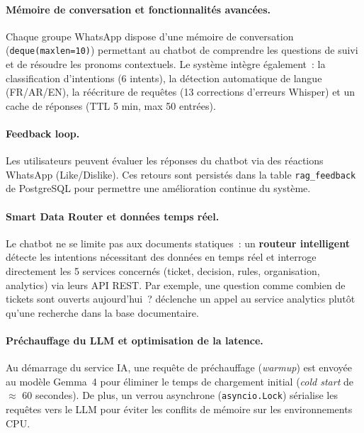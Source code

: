 \paragraph{M\'{e}moire de conversation et fonctionnalit\'{e}s avanc\'{e}es.}
Chaque groupe WhatsApp dispose d'une m\'{e}moire de conversation (\texttt{deque(maxlen=10)}) permettant au chatbot de comprendre les questions de suivi et de r\'{e}soudre les pronoms contextuels. Le syst\`{e}me int\`{e}gre \'{e}galement~: la classification d'intentions (6 intents), la d\'{e}tection automatique de langue (FR/AR/EN), la r\'{e}\'{e}criture de requ\^{e}tes (13 corrections d'erreurs Whisper) et un cache de r\'{e}ponses (TTL 5 min, max 50 entr\'{e}es).

\paragraph{Feedback loop.}
Les utilisateurs peuvent \'{e}valuer les r\'{e}ponses du chatbot via des r\'{e}actions WhatsApp (Like/Dislike). Ces retours sont persist\'{e}s dans la table \texttt{rag\_feedback} de PostgreSQL pour permettre une am\'{e}lioration continue du syst\`{e}me.

\paragraph{Smart Data Router et donn\'{e}es temps r\'{e}el.}
Le chatbot ne se limite pas aux documents statiques~: un \textbf{routeur intelligent} d\'{e}tecte les intentions n\'{e}cessitant des donn\'{e}es en temps r\'{e}el et interroge directement les 5 services concern\'{e}s (ticket, decision, rules, organisation, analytics) via leurs API REST. Par exemple, une question comme \og combien de tickets sont ouverts aujourd'hui~? \fg d\'{e}clenche un appel au service analytics plut\^{o}t qu'une recherche dans la base documentaire.

\paragraph{Pr\'{e}chauffage du LLM et optimisation de la latence.}
Au d\'{e}marrage du service IA, une requ\^{e}te de pr\'{e}chauffage (\textit{warmup}) est envoy\'{e}e au mod\`{e}le Gemma~4 pour \'{e}liminer le temps de chargement initial (\textit{cold start} de $\approx$ 60 secondes). De plus, un verrou asynchrone (\texttt{asyncio.Lock}) s\'{e}rialise les requ\^{e}tes vers le LLM pour \'{e}viter les conflits de m\'{e}moire sur les environnements CPU.

